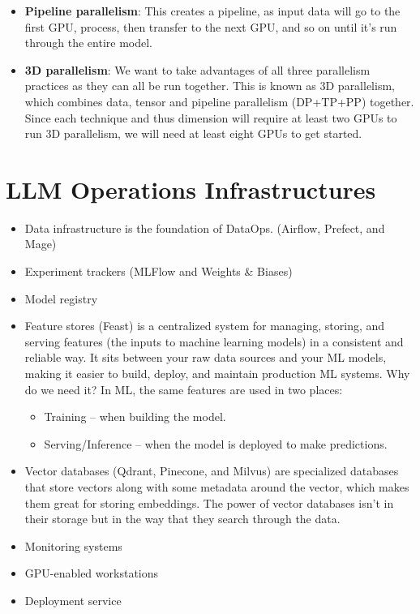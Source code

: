 \begin{itemize}
\begin{itemize}
			\item \textbf{Pipeline parallelism}: This creates a pipeline, as input data will go to the first GPU, process, then transfer to the next GPU, and so on until it's run through the entire model. 
			\item \textbf{3D parallelism}: We want to take advantages of all three parallelism practices as they can all be run together. This is known as 3D parallelism, which combines data, tensor and pipeline parallelism (DP+TP+PP) together. Since each technique and thus dimension will require at least two GPUs to run 3D parallelism, we will need at least eight GPUs to get started. 
		\end{itemize}
\end{itemize}

\section{LLM Operations Infrastructures}
\begin{itemize}
	\item Data infrastructure is the foundation of DataOps. (\eg Airflow, Prefect, and Mage)  
	\item Experiment trackers (\eg MLFlow and Weights \& Biases)
	\item Model registry 
	\item Feature stores (\eg Feast) is a centralized system for managing, storing, and serving features (the inputs to machine learning models) in a consistent and reliable way. It sits between your raw data sources and your ML models, making it easier to build, deploy, and maintain production ML systems. Why do we need it? In ML, the same features are used in two places:
		\begin{itemize}
			\item Training – when building the model.
			\item Serving/Inference – when the model is deployed to make predictions.
		\end{itemize}
	\item Vector databases (\eg Qdrant, Pinecone, and Milvus) are specialized databases that store vectors along with some metadata around the vector, which makes them great for storing embeddings. The power of vector databases isn't in their storage but in the way that they search through the data. 
	\item Monitoring systems
	\item GPU-enabled workstations
	\item Deployment service
\end{itemize}





